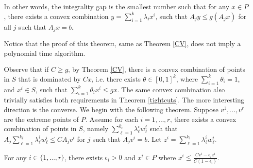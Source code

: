 \documentclass[runningheads]{llncs}
\begin{document}
\tightcuts*

In other words, the integrality gap is the smallest number such that for any $x\in P$, there exists a convex combination $y=\sum_{i=1}^{k}\lambda_ix^i$, such that $A_jy\leq g(A_jx)$ for all $j$ such that $A_jx=b$. 

Notice that the proof of this theorem, same as Theorem \ref{CV}, does not imply a polynomial time algorithm.

Observe that if $C\geq g$, by Theorem \ref{CV}, there is a convex combination of points in $S$ that is dominated by $Cx$, i.e. there exists $\theta\in [0,1]^{k}$, where $\sum_{i=1}^{k}\theta_i=1$, and $x^i\in S$, such that $\sum_{i=1}^{k}\theta_ix^i\leq gx$. The same convex combination also trivially satisfies both requirements in Theorem \ref{tightcuts}. The more interesting direction is the converse. We begin with the following theorem. Suppose $v^1,\ldots,v^r$ are the extreme points of $P$. Assume for each $i=1,\ldots,r$, there exists a convex combination of points in $S$, namely $\sum_{\ell=1}^{k_i} \lambda^i_\ell w^i_\ell$ such that $A_j \sum_{\ell=1}^{k_i} \lambda^i_\ell w^i_\ell \leq CA_jv^i$ for $j$ such that $A_jv^i = b$. Let $z^i = \sum_{\ell=1}^{k_i} \lambda^i_\ell w^i_\ell$.
\begin{lemma}\label{epsilon}
	For any  $i\in\{1,\ldots,r\}$, there exists $\epsilon_i >0$ and ${x^i}\in P$ where ${x^i}\leq \frac{Cv^i-\epsilon_i z^i}{C(1-\epsilon_i)}$.
\end{lemma}
\end{document}
